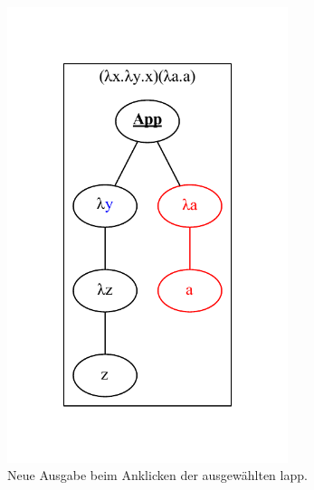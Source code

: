 \documentclass[parskip=full,11pt,twoside]{scrartcl}
\begin{document}
\begin{figure}[H]
\begin{subfigure}{0.25\textwidth}
		\includegraphics[width=0.9\textwidth]{img/displayTree3}
		\caption{Neue Ausgabe beim Anklicken der ausgewählten \gls{lapp}.}
	\end{subfigure}
	\hspace*{\fill}
	\begin{subfigure}{0.25\textwidth}
		\centering

\end{subfigure}
\end{figure}
\end{document}
